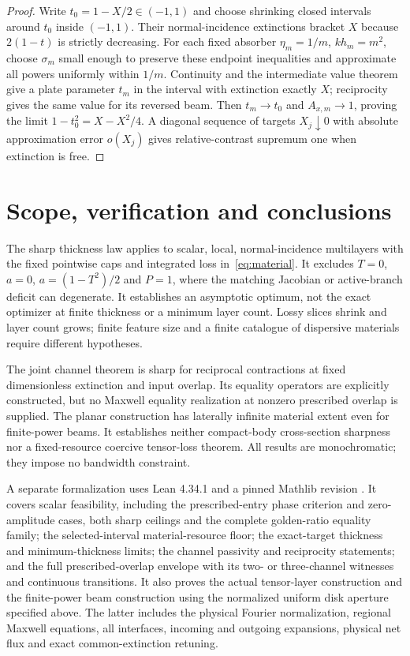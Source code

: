 \documentclass[11pt,a4paper]{article}
\theoremstyle{remark}
\begin{document}
\begin{proof}
Write $t_0=1-X/2\in(-1,1)$ and choose shrinking closed intervals around $t_0$ inside $(-1,1)$. Their normal-incidence extinctions bracket $X$ because $2(1-t)$ is strictly decreasing. For each fixed absorber $\eta_m=1/m$, $kh_m=m^2$, choose $\sigma_m$ small enough to preserve these endpoint inequalities and approximate all powers uniformly within $1/m$. Continuity and the intermediate value theorem give a plate parameter $t_m$ in the interval with extinction exactly $X$; reciprocity gives the same value for its reversed beam. Then $t_m\to t_0$ and $A_{x,m}\to1$, proving the limit $1-t_0^2=X-X^2/4$. A diagonal sequence of targets $X_j\downarrow0$ with absolute approximation error $o(X_j)$ gives relative-contrast supremum one when extinction is free.
\end{proof}

\section{Scope, verification and conclusions}\label{sec:scope}
The sharp thickness law applies to scalar, local, normal-incidence multilayers with the fixed pointwise caps and integrated loss in~\eqref{eq:material}. It excludes $T=0$, $a=0$, $a=(1-T^2)/2$ and $P=1$, where the matching Jacobian or active-branch deficit can degenerate. It establishes an asymptotic optimum, not the exact optimizer at finite thickness or a minimum layer count. Lossy slices shrink and layer count grows; finite feature size and a finite catalogue of dispersive materials require different hypotheses.

The joint channel theorem is sharp for reciprocal contractions at fixed dimensionless extinction and input overlap. Its equality operators are explicitly constructed, but no Maxwell equality realization at nonzero prescribed overlap is supplied. The planar construction has laterally infinite material extent even for finite-power beams. It establishes neither compact-body cross-section sharpness nor a fixed-resource coercive tensor-loss theorem. All results are monochromatic; they impose no bandwidth constraint.

A separate formalization uses Lean 4.34.1 \citep{deMouraUllrich2021} and a pinned Mathlib revision \citep{mathlib2020}. It covers scalar feasibility, including the prescribed-entry phase criterion and zero-amplitude cases, both sharp ceilings and the complete golden-ratio equality family; the selected-interval material-resource floor; the exact-target thickness and minimum-thickness limits; the channel passivity and reciprocity statements; and the full prescribed-overlap envelope with its two- or three-channel witnesses and continuous transitions. It also proves the actual tensor-layer construction and the finite-power beam construction using the normalized uniform disk aperture specified above. The latter includes the physical Fourier normalization, regional Maxwell equations, all interfaces, incoming and outgoing expansions, physical net flux and exact common-extinction retuning.
\end{document}
